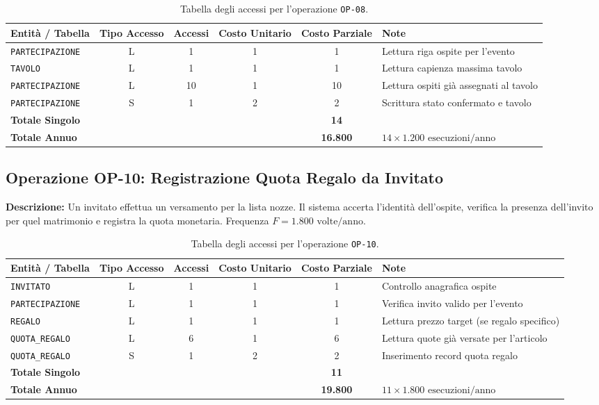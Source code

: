 \begin{table}[h!]
\centering
\small
\begin{tabular}{l c c c c l}
\toprule
\textbf{Entità / Tabella} & \textbf{Tipo Accesso} & \textbf{Accessi} & \textbf{Costo Unitario} & \textbf{Costo Parziale} & \textbf{Note} \\
\midrule
\texttt{PARTECIPAZIONE} & L & 1 & 1 & 1 & Lettura riga ospite per l'evento \\
\texttt{TAVOLO} & L & 1 & 1 & 1 & Lettura capienza massima tavolo \\
\texttt{PARTECIPAZIONE} & L & 10 & 1 & 10 & Lettura ospiti già assegnati al tavolo \\
\texttt{PARTECIPAZIONE} & S & 1 & 2 & 2 & Scrittura stato confermato e tavolo \\
\midrule
\textbf{Totale Singolo} & & & & \textbf{14} & \\
\textbf{Totale Annuo} & & & & \textbf{16.800} & $14 \times 1.200 \text{ esecuzioni/anno}$ \\
\bottomrule
\end{tabular}
\caption{Tabella degli accessi per l'operazione \texttt{OP-08}.}
\end{table}

\subsection{Operazione OP-10: Registrazione Quota Regalo da Invitato}
\textbf{Descrizione:} Un invitato effettua un versamento per la lista nozze. Il sistema accerta l'identità dell'ospite, verifica la presenza dell'invito per quel matrimonio e registra la quota monetaria. Frequenza $F = 1.800 \text{ volte/anno}$.

\begin{table}[h!]
\centering
\small
\begin{tabular}{l c c c c l}
\toprule
\textbf{Entità / Tabella} & \textbf{Tipo Accesso} & \textbf{Accessi} & \textbf{Costo Unitario} & \textbf{Costo Parziale} & \textbf{Note} \\
\midrule
\texttt{INVITATO} & L & 1 & 1 & 1 & Controllo anagrafica ospite \\
\texttt{PARTECIPAZIONE} & L & 1 & 1 & 1 & Verifica invito valido per l'evento \\
\texttt{REGALO} & L & 1 & 1 & 1 & Lettura prezzo target (se regalo specifico) \\
\texttt{QUOTA\_REGALO} & L & 6 & 1 & 6 & Lettura quote già versate per l'articolo \\
\texttt{QUOTA\_REGALO} & S & 1 & 2 & 2 & Inserimento record quota regalo \\
\midrule
\textbf{Totale Singolo} & & & & \textbf{11} & \\
\textbf{Totale Annuo} & & & & \textbf{19.800} & $11 \times 1.800 \text{ esecuzioni/anno}$ \\
\bottomrule
\end{tabular}
\caption{Tabella degli accessi per l'operazione \texttt{OP-10}.}
\end{table}


